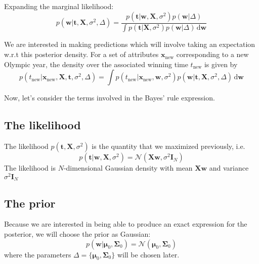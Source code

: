 Expanding the marginal likelihood:
\begin{equation}
p(\mathbf{w} | \mathbf{t}, \mathbf{X}, \sigma^2, \Delta) = 
\frac{p(\mathbf{t}|\mathbf{w},\mathbf{X},\sigma^2) p(\mathbf{w} | \Delta)}%
{\int p(\mathbf{t} | \mathbf{X},\sigma^2) p(\mathbf{w}|\Delta)\,\mathrm{d}\mathbf{w}}
\end{equation}

We are interested in making predictions which will involve taking an expectation
w.r.t this posterior density.
For a set of attributes $\mathbf{x}_{\mathrm{new}}$ corresponding to a new Olympic
year, the density over the associated winning time $t_{\mathrm{new}}$ is given
by
\begin{equation}
p(t_{\mathrm{new}} | \mathbf{x}_{\mathrm{new}},\mathbf{X}, \mathbf{t}, \sigma^2,\Delta) =
\int p(t_{\mathrm{new}} | \mathbf{x}_{\mathrm{new}}, \mathbf{w}, \sigma^2)
p(\mathbf{w} | \mathbf{t}, \mathbf{X}, \sigma^2, \Delta)\,\mathrm{d}\mathbf{w}
\end{equation}

Now, let's consider the terms involved in the Bayes' rule expression.

\subsection{The likelihood}
The likelihood $p(\mathbf{t}, \mathbf{X}, \sigma^2)$ is the quantity that we
maximized previously, i.e.
\begin{equation}
p(\mathbf{t} | \mathbf{w}, \mathbf{X}, \sigma^2 ) =
\mathcal{N}( \mathbf{Xw}, \sigma^2\mathbf{I}_{N} )
\end{equation}
The likelihood is $N$-dimensional Gaussian density with mean $\mathbf{Xw}$ and
variance $\sigma^2\mathbf{I}_{N}$

\subsection{The prior}
Because we are interested in being able to produce an exact expression for the posterior,
we will choose the prior as Gaussian:
\begin{equation}
p(\mathbf{w} | \boldsymbol{\mu}_{0}, \boldsymbol{\Sigma}_{0}) = 
\mathcal{N}(\boldsymbol{\mu}_{0}, \boldsymbol{\Sigma}_{0})
\end{equation}
where the parameters $\Delta = \{ \boldsymbol{\mu}_{0}, \boldsymbol{\Sigma}_{0}\}$
will be chosen later.

